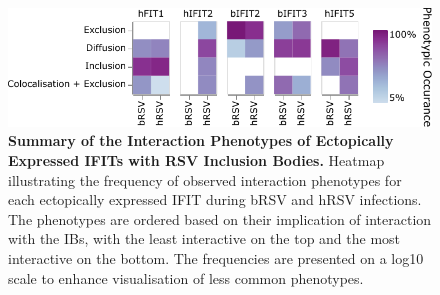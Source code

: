\begin{figure}
    \centering
    \includegraphics[width=1\linewidth]{09. Chapter 4/Figs/heatmap-infection-transfection.pdf}
    \caption[Summary of the Interaction Phenotypes of Ectopically Expressed IFITs with RSV Inclusion Bodies.]{\textbf{Summary of the Interaction Phenotypes of Ectopically Expressed IFITs with RSV Inclusion Bodies.} Heatmap illustrating the frequency of observed interaction phenotypes for each ectopically expressed IFIT during bRSV and hRSV infections. The phenotypes are ordered based on their implication of interaction with the IBs, with the least interactive on the top and the most interactive on the bottom. The frequencies are presented on a log10 scale to enhance visualisation of less common phenotypes.}
    \label{fig:Summary of the Interaction Phenotypes of Ectopically Expressed IFITs with RSV Inclusion Bodies}
\end{figure}


